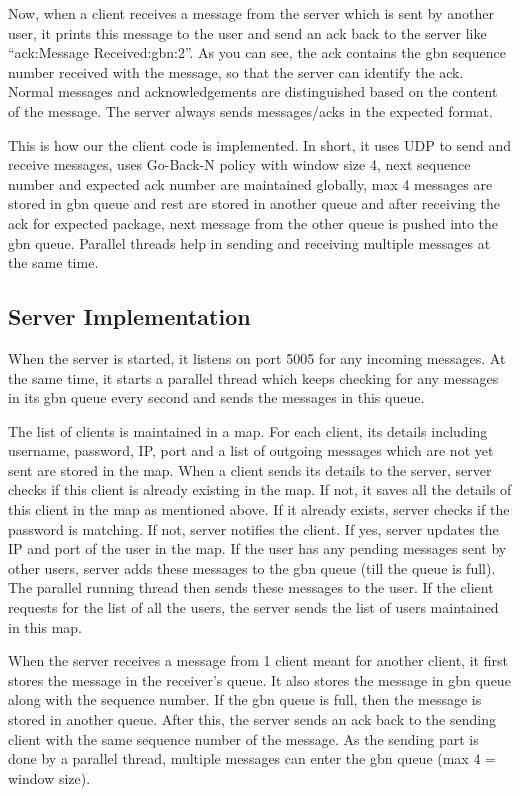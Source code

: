 \documentclass[10pt, pdftex, twocolumn]{report}
\begin{document}
	Now, when a client receives a message from the server which is sent by another user, it prints this message to the user and send an ack back to the server like “ack:Message Received:gbn:2”. As you can see, the ack contains the gbn sequence number received with the message, so that the server can identify the ack. Normal messages and acknowledgements are distinguished based on the content of the message. The server always sends messages/acks in the expected format.
	
	This is how our the client code is implemented. In short, it uses UDP to send and receive messages, uses Go-Back-N policy with window size 4, next sequence number and expected ack number are maintained globally, max 4 messages are stored in gbn queue and rest are stored in another queue and after receiving the ack for expected package, next message from the other queue is pushed into the gbn queue. Parallel threads help in sending and receiving multiple messages at the same time.
	
	
	\subsection*{Server Implementation}
	When the server is started, it listens on port 5005 for any incoming messages. At the same time, it starts a parallel thread which keeps checking for any messages in its gbn queue every second and sends the messages in this queue. 
	
	The list of clients is maintained in a map. For each client, its details including username, password, IP, port and a list of outgoing messages which are not yet sent are stored in the map. When a client sends its details to the server, server checks if this client is already existing in the map. If not, it saves all the details of this client in the map as mentioned above. If it already exists, server checks if the password is matching. If not, server notifies the client. If yes, server updates the IP and port of the user in the map. If the user has any pending messages sent by other users, server adds these messages to the gbn queue (till the queue is full). The parallel running thread then sends these messages to the user. If the client requests for the list of all the users, the server sends the list of users maintained in this map.
	
	When the server receives a message from 1 client meant for another client, it first stores the message in the receiver’s queue. It also stores the message in gbn queue along with the sequence number. If the gbn queue is full, then the message is stored in another queue. After this, the server sends an ack back to the sending client with the same sequence number of the message. As the sending part is done by a parallel thread, multiple messages can enter the gbn queue (max 4 = window size). 
	
\end{document}
